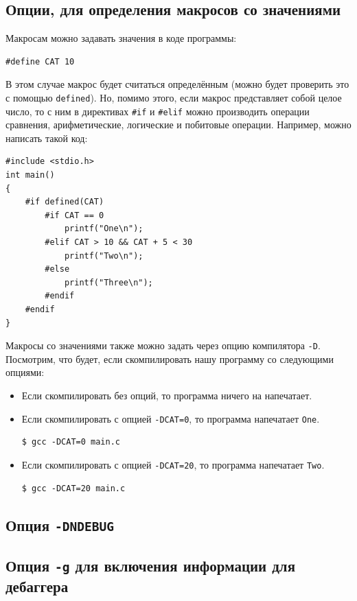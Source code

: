 \documentclass{article}
\begin{document}
\subsection*{Опции, для определения макросов со значениями}
Макросам можно задавать значения в коде программы:
\begin{lstlisting}[style=csMiptCppStyle]
#define CAT 10
\end{lstlisting}
В этом случае макрос будет считаться определённым (можно будет проверить это с помощью \texttt{defined}). Но, помимо этого, если макрос представляет собой целое число, то с ним в директивах \texttt{\#if} и \texttt{\#elif} можно производить операции сравнения, арифметические, логические и побитовые операции. Например, можно написать такой код:
\begin{lstlisting}[style=csMiptCppStyle]
#include <stdio.h>
int main()
{
    #if defined(CAT)
        #if CAT == 0
            printf("One\n");
        #elif CAT > 10 && CAT + 5 < 30
            printf("Two\n");
        #else
            printf("Three\n");
        #endif
    #endif
}
\end{lstlisting}
Макросы со значениями также можно задать через опцию компилятора \texttt{-D}.
Посмотрим, что будет, если скомпилировать нашу программу со следующими опциями:
\begin{itemize}
\item Если скомпилировать без опций, то программа ничего на напечатает.

\item Если скомпилировать с опцией \texttt{-DCAT=0}, то программа напечатает \texttt{One}.
\begin{lstlisting}[style=csMiptBash]
$ gcc -DCAT=0 main.c
\end{lstlisting}

\item Если скомпилировать с опцией \texttt{-DCAT=20}, то программа напечатает \texttt{Two}.
\begin{lstlisting}[style=csMiptBash]
$ gcc -DCAT=20 main.c
\end{lstlisting}
\end{itemize}


\subsection*{Опция \texttt{-DNDEBUG}}



\subsection*{Опция \texttt{-g} для включения информации для дебаггера}
\end{document}
